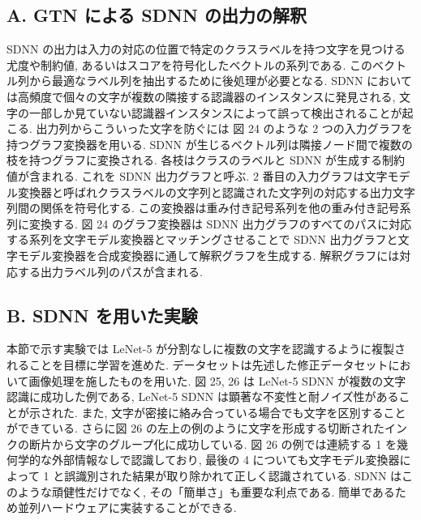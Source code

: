 \documentclass[twocolumn]{jarticle}     %
\begin{document}
\subsection*{A. GTN による SDNN の出力の解釈}
SDNN の出力は入力の対応の位置で特定のクラスラベルを持つ文字を見つける尤度や制約値, あるいはスコアを符号化したベクトルの系列である.
このベクトル列から最適なラベル列を抽出するために後処理が必要となる.
SDNN においては高頻度で個々の文字が複数の隣接する認識器のインスタンスに発見される, 文字の一部しか見ていない認識器インスタンスによって誤って検出されることが起こる.
出力列からこういった文字を防ぐには 図 24 のような 2 つの入力グラフを持つグラフ変換器を用いる.
SDNN が生じるベクトル列は隣接ノード間で複数の枝を持つグラフに変換される.
各枝はクラスのラベルと SDNN が生成する制約値が含まれる. これを SDNN 出力グラフと呼ぶ.
2 番目の入力グラフは文字モデル変換器と呼ばれクラスラベルの文字列と認識された文字列の対応する出力文字列間の関係を符号化する. この変換器は重み付き記号系列を他の重み付き記号系列に変換する. 図 24 のグラフ変換器は SDNN 出力グラフのすべてのパスに対応する系列を文字モデル変換器とマッチングさせることで SDNN 出力グラフと文字モデル変換器を合成変換器に通して解釈グラフを生成する. 解釈グラフには対応する出力ラベル列のパスが含まれる.
\subsection*{B. SDNN を用いた実験}
本節で示す実験では LeNet-5 が分割なしに複数の文字を認識するように複製されることを目標に学習を進めた. データセットは先述した修正データセットにおいて画像処理を施したものを用いた.
図 25, 26 は LeNet-5 SDNN が複数の文字認識に成功した例である, 
LeNet-5 SDNN は顕著な不変性と耐ノイズ性があることが示された. 
また, 文字が密接に絡み合っている場合でも文字を区別することができている. さらに図 26 の左上の例のように文字を形成する切断されたインクの断片から文字のグループ化に成功している.
図 26 の例では連続する 1 を幾何学的な外部情報なしで認識しており, 最後の 4 についても文字モデル変換器によって 1 と誤識別された結果が取り除かれて正しく認識されている. 
SDNN はこのような頑健性だけでなく, その「簡単さ」も重要な利点である. 簡単であるため並列ハードウェアに実装することができる.
\end{document}
